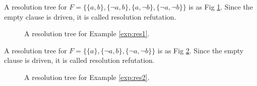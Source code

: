 \documentclass[]{book}
\begin{document}
 \begin{examp}\label{exp:res1}
      A resolution tree for $F = \{\{a,b\},\{\neg a,b\},\{a, \neg b\},\{\neg a, \neg b\}\}$ is as Fig \ref{fig:resol1}. Since the empty clause 
	  is driven, it is called resolution refutation.
	   \begin{figure}
	   \centering  
	   \caption{A resolution tree for Example \ref{exp:res1}.}
	   \label{fig:resol1}
       \end{figure}
\end{examp}

\begin{examp}\label{exp:res2}
      A resolution tree for $F = \{\{a\},\{\neg a,b\},\{\neg a, \neg b\}\}$ is as Fig \ref{fig:resol2}. Since the empty clause 
	  is driven, it is called resolution refutation.
	  \begin{figure}[h]
       \centering
	   \caption{A resolution tree for Example \ref{exp:res2}.}
	   \label{fig:resol2}
       \end{figure}
\end{examp}
 
\end{document}
